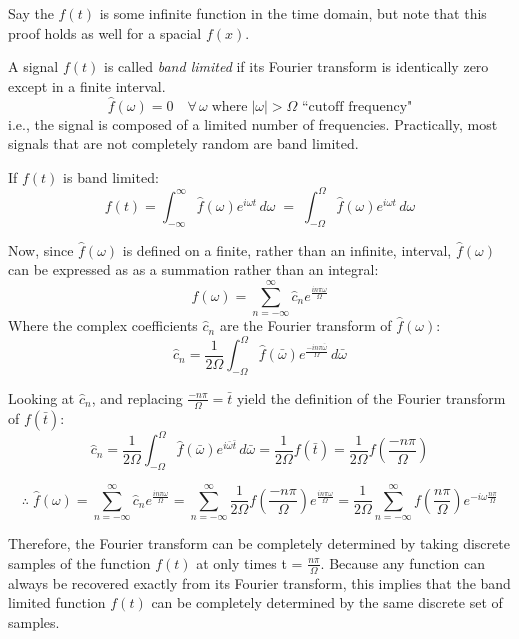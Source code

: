 \documentclass[12pt]{article}
\newcommand{\inftyint}{\int_{-\infty}^{\infty}}
\begin{document}
Say the \(f(t)\) is some infinite function in the time domain, but note that this proof holds as well for a spacial \(f(x)\).

A signal \(f(t)\) is called \emph{band limited} if its Fourier transform is identically zero except in a finite interval.
\[\hat{f}(\omega) = 0 \quad \forall \, \omega \; \text{where} \; |\omega| > \Omega \text{ ``cutoff frequency"}\]
i.e., the signal is composed of a limited number of frequencies. Practically, most signals that are not completely random are band limited.

If \(f(t)\) is band limited:
\begin{equation}
\label{eq:nft}
f(t) = \inftyint \hat{f}(\omega)e^{i\omega t} \,d\omega \; = \; \int_{-\Omega}^{\Omega} \hat{f}(\omega)e^{i\omega t} \,d\omega
\end{equation}

Now, since \( \hat{f}(\omega) \) is defined on a finite, rather than an infinite, interval, \( \hat{f}(\omega) \) can be expressed as as a summation rather than an integral:
\[\hat{f}(\omega) = \sum_{n = -\infty}^{\infty} \hat{c}_{n}e^{\frac{i n \pi \omega}{\Omega}} \]
Where the complex coefficients \( \hat{c}_n\) are the Fourier transform of \( \hat{f}(\omega) \):
\[\hat{ c}_n = \frac{1}{2\Omega} \int_{-\Omega}^{\Omega} \hat{f}(\bar{\omega})e^{\frac{-i n \pi \bar{ \omega}}{\Omega}}\,d\bar{\omega}\]

Looking at \(\hat{c}_n\), and replacing \( \frac{-n\pi}{\Omega} = \bar{t}\) yield the definition of the Fourier transform of \( f(\bar{t})\):
\[ \hat{c}_n = \frac{1}{2\Omega} \int_{-\Omega}^{\Omega} \hat{f}(\bar{\omega})e^{i\bar{\omega}\bar{t}}\,d\bar{\omega} = \frac{1}{2\Omega} f(\bar{t}) = \frac{1}{2\Omega} f(\frac{-n\pi}{\Omega})\]

\begin{equation}
\label{eq:nfhat}
\therefore \; \hat{f}(\omega) = \sum_{n = -\infty}^{\infty} \hat{c}_{n}e^{\frac{i n \pi \omega}{\Omega}} = \sum_{n = -\infty}^{\infty} \frac{1}{2\Omega} f(\frac{-n\pi}{\Omega})e^{\frac{i n \pi \omega}{\Omega}} = \frac{1}{2\Omega} \sum_{n = -\infty}^{\infty} f(\frac{n\pi}{\Omega})e^{-i \omega \frac{n \pi}{\Omega} } 
\end{equation}

Therefore, the Fourier transform can be completely determined by taking discrete samples of the function \( f(t) \) at only times t = \( \frac{n\pi}{\Omega}\). Because any function can always be recovered exactly from its Fourier transform, this implies that the band limited function \( f(t) \) can be completely determined by the same discrete set of samples.
\end{document}
